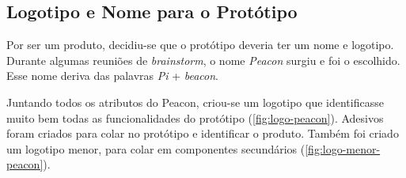\documentclass[
		12pt,				%
		openright,			%
		oneside,			%
		a4paper,			%
		chapter=TITLE,		%
		english,			%
		brazil				%
	]{abntex2}
\begin{document}
\subsection{Logotipo e Nome para o Protótipo}\label{sec:logotipo-prototipo}

Por ser um produto, decidiu-se que o protótipo deveria ter um nome e logotipo. Durante algumas reuniões de \textit{brainstorm}, o nome \textit{Peacon} surgiu e foi o escolhido. Esse nome deriva das palavras \textit{Pi}  + \textit{beacon}.

Juntando todos os atributos do Peacon, criou-se um logotipo que identificasse muito bem todas as funcionalidades do protótipo (\autoref{fig:logo-peacon}). Adesivos foram criados para colar no protótipo e identificar o produto. Também foi criado um logotipo menor, para colar em componentes secundários (\autoref{fig:logo-menor-peacon}).
\end{document}
